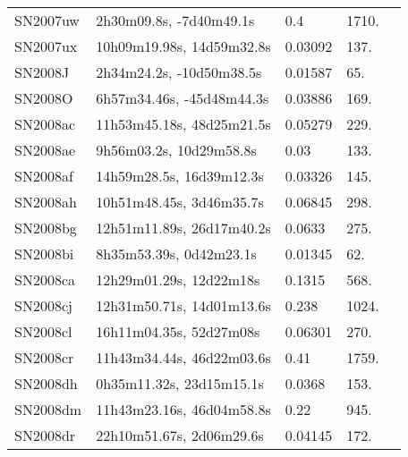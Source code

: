 \begin{longtable}{lllll}
         SN2007uw &        2h30m09.8s, -7d40m49.1s &      0.4 &          1710. &    \citet{2007CBET.1186A...1C} \\
         SN2007ux &      10h09m19.98s, 14d59m32.8s &  0.03092 &           137. &    \citet{2004ApJ...607..202M} \\
          SN2008J &       2h34m24.2s, -10d50m38.5s &  0.01587 &            65. &  \citet{1998AandAS..130..333T} \\
          SN2008O &      6h57m34.46s, -45d48m44.3s &  0.03886 &           169. &    \citet{2003AJ....126.2268W} \\
         SN2008ac &      11h53m45.18s, 48d25m21.5s &  0.05279 &           229. &    \citet{2005SDSS4.C...0000:} \\
         SN2008ae &        9h56m03.2s, 10d29m58.8s &     0.03 &           133. &    \citet{2005SDSS4.C...0000:} \\
         SN2008af &       14h59m28.5s, 16d39m12.3s &  0.03326 &           145. &    \citet{2012MNRAS.422...25S} \\
         SN2008ah &       10h51m48.45s, 3d46m35.7s &  0.06845 &           298. &    \citet{2004SDSS2.C...0000:} \\
         SN2008bg &      12h51m11.89s, 26d17m40.2s &   0.0633 &           275. &    \citet{2008CBET.1308A...1Y} \\
         SN2008bi &        8h35m53.39s, 0d42m23.1s &  0.01345 &            62. &  \citet{1993AandAS...99..379O} \\
         SN2008ca &        12h29m01.29s, 12d22m18s &   0.1315 &           568. &    \citet{2008CBET.1358A...1S} \\
         SN2008cj &      12h31m50.71s, 14d01m13.6s &    0.238 &          1024. &    \citet{2008CBET.1375A...1K} \\
         SN2008cl &        16h11m04.35s, 52d27m08s &  0.06301 &           270. &    \citet{2005AJ....130..968M} \\
         SN2008cr &      11h43m34.44s, 46d22m03.6s &     0.41 &          1759. &    \citet{2008CBET.1389A...1S} \\
         SN2008dh &       0h35m11.32s, 23d15m15.1s &   0.0368 &           153. &    \citet{2008CBET.1409A...1D} \\
         SN2008dm &      11h43m23.16s, 46d04m58.8s &     0.22 &           945. &    \citet{2008CBET.1410A...1S} \\
         SN2008dr &       22h10m51.67s, 2d06m29.6s &  0.04145 &           172. &    \citet{1999ApJS..121..287H} \\

\end{longtable}
